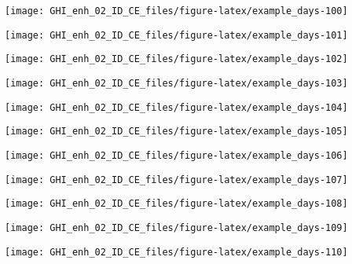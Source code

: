 \documentclass[
  10pt,
  a4paper,oneside]{article}
\begin{document}
\begin{center}\texttt{[image: GHI\_enh\_02\_ID\_CE\_files/figure-latex/example\_days-100]} \end{center}

\begin{center}\texttt{[image: GHI\_enh\_02\_ID\_CE\_files/figure-latex/example\_days-101]} \end{center}

\begin{center}\texttt{[image: GHI\_enh\_02\_ID\_CE\_files/figure-latex/example\_days-102]} \end{center}

\begin{center}\texttt{[image: GHI\_enh\_02\_ID\_CE\_files/figure-latex/example\_days-103]} \end{center}

\begin{center}\texttt{[image: GHI\_enh\_02\_ID\_CE\_files/figure-latex/example\_days-104]} \end{center}

\begin{center}\texttt{[image: GHI\_enh\_02\_ID\_CE\_files/figure-latex/example\_days-105]} \end{center}

\begin{center}\texttt{[image: GHI\_enh\_02\_ID\_CE\_files/figure-latex/example\_days-106]} \end{center}

\begin{center}\texttt{[image: GHI\_enh\_02\_ID\_CE\_files/figure-latex/example\_days-107]} \end{center}

\begin{center}\texttt{[image: GHI\_enh\_02\_ID\_CE\_files/figure-latex/example\_days-108]} \end{center}

\begin{center}\texttt{[image: GHI\_enh\_02\_ID\_CE\_files/figure-latex/example\_days-109]} \end{center}

\begin{center}\texttt{[image: GHI\_enh\_02\_ID\_CE\_files/figure-latex/example\_days-110]} \end{center}
\end{document}
